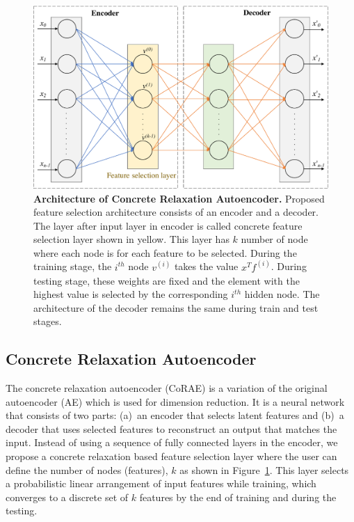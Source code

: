 \documentclass{bioinfo}
\begin{document}
\begin{figure}[h!]
    \centering
    \includegraphics[scale=0.5]{fig/architecture.pdf}
    \caption{\textbf{Architecture of Concrete Relaxation Autoencoder.} Proposed feature selection architecture consists of an encoder and a decoder. The layer after input layer in encoder is called concrete feature selection layer shown in yellow. This layer has $k$ number of node where each node is for each feature to be selected. During the training stage, the $i^{th}$ node $v^{(i)}$ takes the value $x^Tf^{(i)}$.
During testing stage, these weights are fixed and the element with the highest value is selected by the corresponding $i^{th}$ hidden node.
The architecture of the decoder remains the same during train and test stages.}
    \label{fig:architecture}
\end{figure}
\subsection{Concrete Relaxation Autoencoder} \label{CoRAE}
The concrete relaxation autoencoder (CoRAE) is a variation of the original autoencoder (AE) \citep{hinton2006reducing} which is used for dimension reduction. 
It is a neural network that consists of two parts: (a)~an encoder that selects latent features and (b)~a decoder that uses selected features to reconstruct an output that matches the input. 
Instead of using a sequence of fully connected layers in the encoder,  we propose a concrete relaxation based feature selection layer where the user can define the number of nodes (features), $k$ as shown in Figure~\ref{fig:architecture}. 
This layer selects a probabilistic linear arrangement of input features while training, which converges to a discrete set of $k$ features by the end of training and during the testing. 
\end{document}
